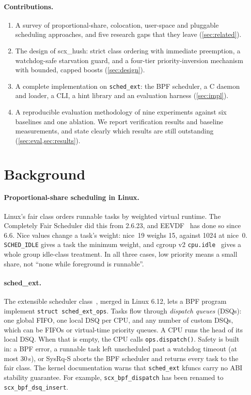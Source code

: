 \documentclass[11pt,a4paper]{article}
\newcommand{\code}[1]{\texttt{#1}}
\begin{document}
\paragraph{Contributions.}
\begin{enumerate}
\item A survey of proportional-share, colocation, user-space and pluggable
  scheduling approaches, and five research gaps that they leave
  (\cref{sec:related}).
\item The design of scx\_hush: strict class ordering with immediate
  preemption, a watchdog-safe starvation guard, and a four-tier
  priority-inversion mechanism with bounded, capped boosts
  (\cref{sec:design}).
\item A complete implementation on \code{sched\_ext}: the BPF scheduler, a
  C daemon and loader, a CLI, a hint library and an evaluation harness
  (\cref{sec:impl}).
\item A reproducible evaluation methodology of nine experiments against six
  baselines and one ablation. We report verification results and baseline
  measurements, and state clearly which results are still outstanding
  (\cref{sec:eval,sec:results}).
\end{enumerate}

\section{Background}
\label{sec:background}

\paragraph{Proportional-share scheduling in Linux.}
Linux's fair class orders runnable tasks by weighted virtual runtime. The
Completely Fair Scheduler did this from 2.6.23, and EEVDF~\cite{stoica1995eevdf}
has done so since 6.6. Nice values change a task's weight: nice~19 weighs
15, against 1024 at nice~0. \code{SCHED\_IDLE} gives a task the minimum
weight, and cgroup v2 \code{cpu.idle}~\cite{cgroupv2-docs} gives a whole group
idle-class treatment. In all three cases, low priority means a small share,
not ``none while foreground is runnable''.

\paragraph{sched\_ext.}
The extensible scheduler class~\cite{schedext-docs}, merged in Linux 6.12,
lets a BPF program implement \code{struct sched\_ext\_ops}. Tasks flow through
\emph{dispatch queues} (DSQs): one global FIFO, one local DSQ per CPU, and
any number of custom DSQs, which can be FIFOs or virtual-time priority queues.
A CPU runs the head of its local DSQ. When that is empty, the CPU calls
\code{ops.dispatch()}. Safety is built in: a BPF error, a runnable task left
unscheduled past a watchdog timeout (at most 30\,s), or SysRq-S aborts the
BPF scheduler and returns every task to the fair class. The kernel
documentation warns that \code{sched\_ext} kfuncs carry no ABI stability
guarantee. For example, \code{scx\_bpf\_dispatch} has been renamed to
\code{scx\_bpf\_dsq\_insert}.
\end{document}
